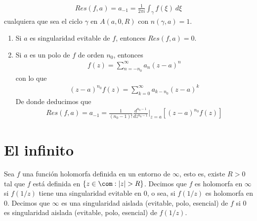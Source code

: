 \begin{obs}
\begin{enumerate}
\begin{align*}
    \boxed{
        Res(f,a) = a_{-1} = \frac{1}{2\pi i} \int_{\gamma} f(\xi) \ d \xi
    }
    \end{align*}
    cualquiera que sea el ciclo $\gamma$ en $A(a,0,R)$ con $n(\gamma,a) = 1$. 
    \begin{enumerate}
        \item Si $a$ es singularidad evitable de $f$, entonces $Res(f,a) = 0$.
        \item Si $a$ es un polo de $f$ de orden $n_0$, entonces
            \begin{align*}
        f(z) = \sum_{n = -n_0}^{\infty}{a_n(z-a)^n}
    \end{align*}
    con lo que
    \begin{align*}
        (z-a)^{n_0}f(z) = \sum_{k = 0}^{\infty}{a_{k-n_0}(z-a)^k}
    \end{align*}
    De donde deducimos que
    \begin{align*}
    \boxed{
        Res(f,a) = a_{-1} = \frac{1}{(n_0-1)!} \frac{d^{n_0-1}}{dz^{n_0 - 1}}\Big|_{z=a} \left[ (z-a)^{n_0}f(z)\right]
    }
    \end{align*}
    \end{enumerate}
\end{enumerate}
\end{obs}

\section{El infinito}

\begin{defi}
Sea $f$ una función holomorfa definida en un entorno de $\infty$, esto es, existe $R>0$ tal que $f$ está definida en $\{z \in \com : |z| > R \}$. Decimos que $f$ es holomorfa en $\infty$ si $f(1/z)$ tiene una singularidad evitable en $0$, o sea, si $f(1/z)$ es holomorfa en $0$. Decimos que $\infty$ es una singularidad aislada (evitable, polo, esencial) de $f$ si $0$ es singularidad aislada (evitable, polo, esencial) de $f(1/z)$.
\end{defi}

